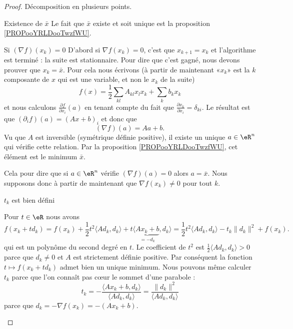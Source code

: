 \begin{proof}
    Décomposition en plusieurs points.
    \begin{subproof}
    \item[Existence de \( \bar x\)]
        Le fait que \( \bar x\) existe et soit unique est la proposition \ref{PROPooYRLDooTwzfWU}.
    \item[Si \( (\nabla f)(x_k)=0\)]
    D'abord si \( \nabla f(x_k)=0\), c'est que \( x_{k+1}=x_k\) et l'algorithme est terminé : la suite est stationnaire. Pour dire que c'est gagné, nous devons prouver que \( x_k=\bar x\). Pour cela nous écrivons (à partir de maintenant «\( x_k\)» est la \( k\)\ieme composante de \( x\) qui est une variable, et non le \( x_k\) de la suite)
    \begin{equation}
        f(x)=\frac{ 1 }{2}\sum_{kl}A_{kl}x_lx_k+\sum_{k}b_kx_k
    \end{equation}
    et nous calculons \( \frac{ \partial f }{ \partial x_i }(a)\) en tenant compte du fait que \( \frac{ \partial x_k }{ \partial x_i }=\delta_{ki}\). Le résultat est que \( (\partial_if)(a)=(Ax+b)_i\) et donc que
    \begin{equation}
        (\nabla f)(a)=Aa+b.
    \end{equation}
    Vu que \( A\) est inversible (symétrique définie positive), il existe un unique \( a\in \eR^n\) qui vérifie cette relation. Par la proposition \ref{PROPooYRLDooTwzfWU}, cet élément est le minimum \( \bar x\).

    Cela pour dire que si \( a\in \eR^n\) vérifie \( (\nabla f)(a)=0\) alors \( a=\bar x\). Nous supposons donc à partir de maintenant que \( \nabla f(x_k)\neq 0\) pour tout \( k\).
        \item[\( t_k\) est bien défini]

            Pour \( t\in \eR\) nous avons
            \begin{equation}    \label{EqKEHooYaazQi}
                f(x_k+td_k)=f(x_k)+\frac{ 1 }{2}t^2\langle Ad_k, d_k\rangle +t\langle \underbrace{Ax_k+b}_{=-d_k}, d_k\rangle=\frac{ 1 }{2}t^2\langle Ad_k, d_k\rangle -t_k\| d_k \|^2 +f(x_k).
            \end{equation}
            qui est un polynôme du second degré en \( t\). Le coefficient de \( t^2\) est \( \frac{ 1 }{2}\langle Ad_k, d_k\rangle >0\) parce que \( d_k\neq 0\) et \( A\) est strictement définie positive. Par conséquent la fonction \( t\mapsto f(x_k+td_k)\) admet bien un unique minimum. Nous pouvons même calculer \( t_k\) parce que l'on connaît pas cœur le sommet d'une parabole :
            \begin{equation}    \label{EqVWJooWmDSER}
                t_k=-\frac{ \langle Ax_k+b, d_k\rangle  }{ \langle Ad_k, d_k\rangle  }=\frac{ \| d_k \|^2 }{ \langle Ad_k, d_k\rangle  }
            \end{equation}
            parce que \( d_k=-\nabla f(x_k)=-(Ax_k+b)\).


\end{subproof}
\end{proof}
